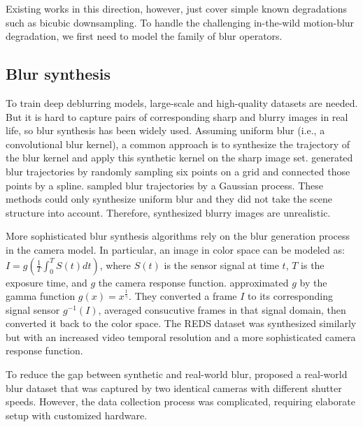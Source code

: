 \documentclass[final]{cvpr}
\begin{document}
Existing works in this direction, however, just cover simple known degradations such as bicubic downsampling. To handle the challenging in-the-wild motion-blur degradation, we first need to model the family of blur operators.

\subsection{Blur synthesis}
To train deep deblurring models, large-scale and high-quality datasets are needed. But it is hard to capture pairs of corresponding sharp and blurry images in real life, so blur synthesis has been widely used. Assuming uniform blur (i.e., a convolutional blur kernel), a common approach is to synthesize the trajectory of the blur kernel and apply this synthetic kernel on the sharp image set. \citet{chakrabarti2016neural} generated blur trajectories by randomly sampling six points on a grid and connected those points by a spline. \citet{schuler2015learning} sampled blur trajectories by a Gaussian process. These methods could only synthesize uniform blur and they did not take the scene structure into account. Therefore, synthesized blurry images are unrealistic. 


More sophisticated blur synthesis algorithms rely on the blur generation process in the camera model. In particular, an image in color space can be modeled as: $I = g \left(\frac{1}{T} \int_0^T S(t)dt\right)$, 
where $S(t)$ is the sensor signal at time $t$, $T$ is the exposure time, and $g$ the camera response function. \citet{nah2017deep} approximated $g$ by the gamma function $g(x) = x^{\frac{1}{\gamma}}$. They converted a frame $I$ to its corresponding signal sensor $g^{-1}(I)$, averaged consucutive frames in that signal domain, then converted it back to the color space. The REDS dataset \cite{nah2019ntire} was synthesized similarly but with an increased video temporal resolution and a more sophisticated camera response function.

To reduce the gap between synthetic and real-world blur, \citet{rim_2020_ECCV} proposed a real-world blur dataset that was captured by two identical cameras with different shutter speeds. However, the data collection process was complicated, requiring elaborate setup with customized hardware.

\end{document}

